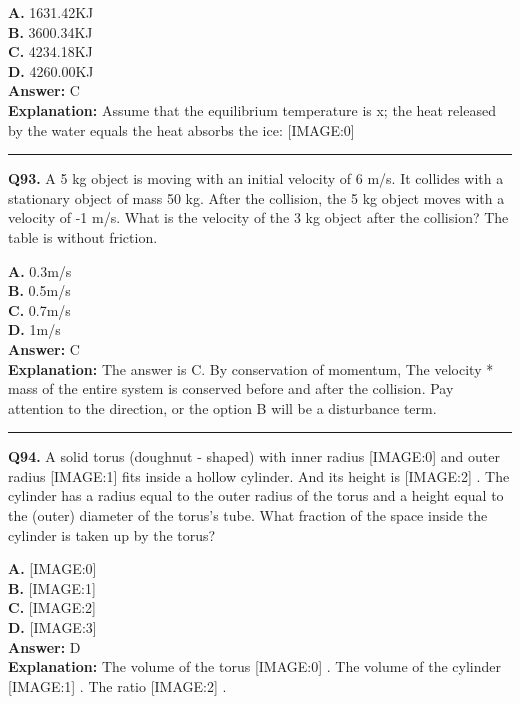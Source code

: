 \documentclass[12pt]{article}
\begin{document}
\textbf{A.} 1631.42KJ \\
\textbf{B.} 3600.34KJ \\
\textbf{C.} 4234.18KJ \\
\textbf{D.} 4260.00KJ \\

\textbf{Answer:} C \\
\textbf{Explanation:} Assume that the equilibrium temperature is x; the heat released by the water equals the heat absorbs the ice:
[IMAGE:0]

\hrule
\vspace{1em}


\noindent
\textbf{Q93.} A 5 kg object is moving with an initial velocity of 6 m/s. It collides with a stationary object of mass 50 kg. After the collision, the 5 kg object moves with a velocity of -1 m/s. What is the velocity of the 3 kg object after the collision? The table is without friction.



\textbf{A.} 0.3m/s \\
\textbf{B.} 0.5m/s \\
\textbf{C.} 0.7m/s \\
\textbf{D.} 1m/s \\

\textbf{Answer:} C \\
\textbf{Explanation:} The answer is C.
By conservation of momentum, The velocity * mass of the entire system is conserved before and after the collision.
Pay attention to the direction, or the option B will be a disturbance term.

\hrule
\vspace{1em}


\noindent
\textbf{Q94.} A solid torus (doughnut - shaped) with inner radius
[IMAGE:0]
and outer radius
[IMAGE:1]
fits inside a hollow cylinder. And its height is
[IMAGE:2]
. The cylinder has a radius equal to the outer radius of the torus and a height equal to the (outer) diameter of the torus's tube. What fraction of the space inside the cylinder is taken up by the torus?



\textbf{A.} [IMAGE:0] \\
\textbf{B.} [IMAGE:1] \\
\textbf{C.} [IMAGE:2] \\
\textbf{D.} [IMAGE:3] \\

\textbf{Answer:} D \\
\textbf{Explanation:} The volume of the torus
[IMAGE:0]
. The volume of the cylinder
[IMAGE:1]
. The ratio
[IMAGE:2]
.
\end{document}

